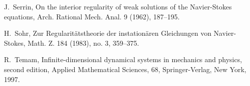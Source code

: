 \documentclass[12pt]{amsart}
\theoremstyle{remark}
\begin{document}
\begin{thebibliography}{999}
J.~Serrin,
On the interior regularity of weak solutions of the Navier-Stokes equations,
Arch. Rational Mech. Anal.  9  (1962), 187--195.

H.~Sohr,
Zur Regularit\"atstheorie der instation\"aren Gleichungen von Navier-Stokes, 
Math. Z.  184  (1983),  no. 3, 359--375.

R.~Temam,
Infinite-dimensional dynamical systems in mechanics and physics,
second edition, Applied Mathematical Sciences, 68,
Springer-Verlag, New York, 1997.

\end{thebibliography}
\end{document}
